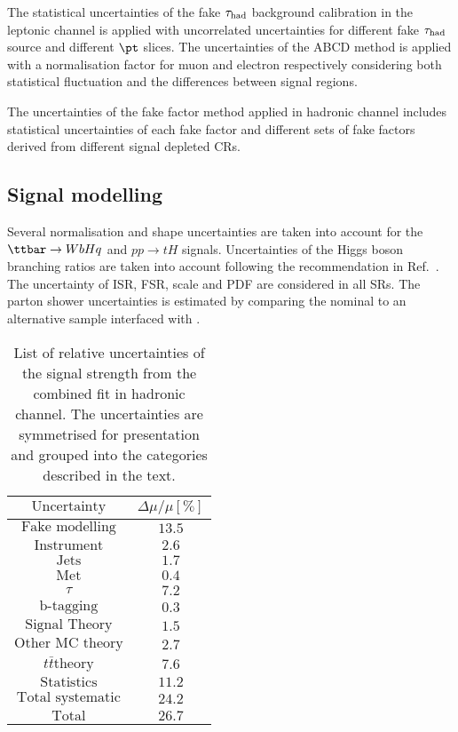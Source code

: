 The statistical uncertainties of the fake $\tau_{\mathrm{had}}$ background calibration in the leptonic channel is applied with uncorrelated uncertainties for different fake $\tau_{\mathrm{had}}$ source and different $\pt$ slices. The uncertainties of the ABCD method is applied with a normalisation factor for muon and electron respectively considering both statistical fluctuation and the differences between signal regions.

The uncertainties of the fake factor method applied in hadronic channel includes statistical uncertainties of each fake factor and different sets of fake factors derived from different signal depleted CRs.

\subsection{Signal modelling}
\label{sec:syst_sigmodeling}

Several normalisation and shape uncertainties are taken into account for the $\Hq$ and $pp\to tH$ signals.
Uncertainties of the Higgs boson branching ratios are taken into account
following the recommendation in Ref.~\cite{deFlorian:2016spz}.
The uncertainty of ISR, FSR, scale and PDF are considered in all SRs. The parton shower uncertainties is estimated by comparing
the nominal to an alternative sample interfaced with {}.



\begin{table}[htbp]
\caption{List of relative uncertainties of the signal strength from the combined fit in hadronic channel. The uncertainties are symmetrised for presentation and grouped into the categories described in the text. %
}
\small
\centering
\begin{tabular}{cc} \toprule\toprule
$\text{Uncertainty}    $   & $\Delta\mu/\mu[\%]$ \\\midrule
$\text{Fake modelling} $   & $13.5$ \\
$\text{Instrument}     $   & $2.6$  \\
$\text{Jets}           $   & $1.7$   \\
$\text{Met}            $   & $0.4$   \\
$\tau                  $   & $7.2$    \\
$\text{b-tagging}       $  & $0.3$    \\
$\text{Signal Theory}  $   & $1.5$   \\
$\text{Other MC theory} $  & $2.7$    \\
$t\bar{t} \text{theory}$  & $7.6$     \\\midrule
$\text{Statistics}      $  & $11.2$   \\
$\text{Total systematic}$  & $24.2$  \\ \midrule
$\text{Total}  $           & $26.7$ \\
\bottomrule\bottomrule
\end{tabular}
\label{tab:had_sys_impact}
\end{table} 


